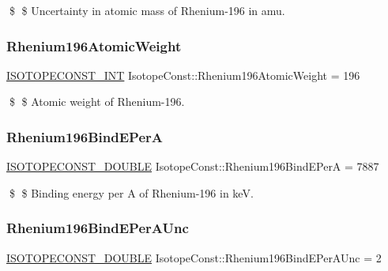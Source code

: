 \$ \$ Uncertainty in atomic mass of Rhenium-\/196 in amu. \mbox{\label{group___isotope_const-_rhenium-_re196_gaad036876905fa3db10577fc822dfd83c}} 
\subsubsection{\texorpdfstring{Rhenium196\+Atomic\+Weight}{Rhenium196AtomicWeight}}
{\footnotesize\ttfamily \mbox{\hyperlink{group___isotope_const-_macros_ga5f18360b3e99483a35c32d789e62621c}{I\+S\+O\+T\+O\+P\+E\+C\+O\+N\+S\+T\+\_\+\+I\+NT}} Isotope\+Const\+::\+Rhenium196\+Atomic\+Weight = 196}

\$ \$ Atomic weight of Rhenium-\/196. \mbox{\label{group___isotope_const-_rhenium-_re196_gabe5afb1b6e2c3e7144c08468b0794fbe}} 
\subsubsection{\texorpdfstring{Rhenium196\+Bind\+E\+PerA}{Rhenium196BindEPerA}}
{\footnotesize\ttfamily \mbox{\hyperlink{group___isotope_const-_macros_ga8f45a7272ce02c0b4c65c44636ed719a}{I\+S\+O\+T\+O\+P\+E\+C\+O\+N\+S\+T\+\_\+\+D\+O\+U\+B\+LE}} Isotope\+Const\+::\+Rhenium196\+Bind\+E\+PerA = 7887}

\$ \$ Binding energy per A of Rhenium-\/196 in keV. \mbox{\label{group___isotope_const-_rhenium-_re196_gadd0ad17b93ad969ad83a12c6a1cbef53}} 
\subsubsection{\texorpdfstring{Rhenium196\+Bind\+E\+Per\+A\+Unc}{Rhenium196BindEPerAUnc}}
{\footnotesize\ttfamily \mbox{\hyperlink{group___isotope_const-_macros_ga8f45a7272ce02c0b4c65c44636ed719a}{I\+S\+O\+T\+O\+P\+E\+C\+O\+N\+S\+T\+\_\+\+D\+O\+U\+B\+LE}} Isotope\+Const\+::\+Rhenium196\+Bind\+E\+Per\+A\+Unc = 2}

